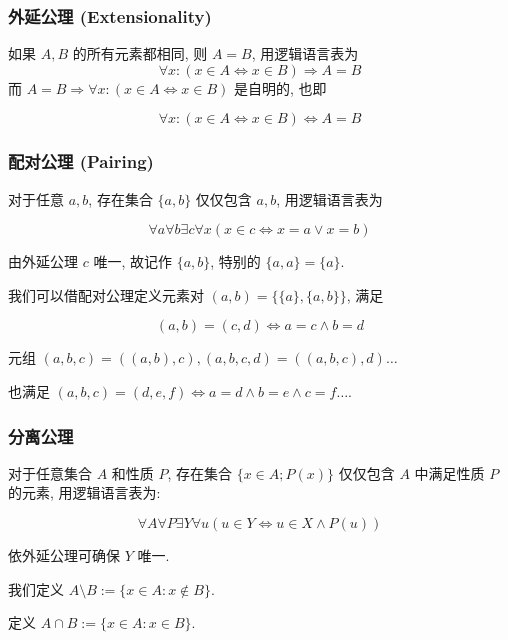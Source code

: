 \subsubsection{外延公理 (Extensionality)}

如果 \(A, B\) 的所有元素都相同, 则 \(A = B\), 用逻辑语言表为
\[
    \forall x : (x \in A \Leftrightarrow x \in B) \Rightarrow A = B
\]
而 \(A = B \Rightarrow \forall x : (x \in A \Leftrightarrow x \in B)\) 是自明的, 也即 

\[
    \forall x : (x \in A \Leftrightarrow x \in B) \Leftrightarrow A = B
\]

\subsubsection{配对公理 (Pairing)}

对于任意 \(a, b\), 存在集合 \(\{a,b\}\) 仅仅包含 \(a,b\), 用逻辑语言表为

\[
    \forall a \forall b \exists c \forall x (x \in c \Leftrightarrow x = a \vee x = b)
\]

由外延公理 \(c\) 唯一, 故记作 \(\{a,b\}\), 特别的 \(\{a,a\} = \{a\}\).

\begin{example}
    我们可以借配对公理定义元素对 \((a,b) = \{\{a\}, \{a,b\}\}\), 满足

    \[
        (a,b) = (c,d) \Leftrightarrow a = c \wedge b = d
    \]

    元组 \((a,b,c) = ((a,b),c), (a,b,c,d) = ((a,b,c),d) \dots\)

    也满足 \((a,b,c) = (d,e,f) \Leftrightarrow a = d \wedge b = e \wedge c = f \dots\).
\end{example}

\subsubsection{分离公理}

对于任意集合 \(A\) 和性质 \(P\), 存在集合 \(\{x \in A; P(x)\}\) 仅仅包含 \(A\) 中满足性质 \(P\) 的元素,
用逻辑语言表为:

\[
    \forall A \forall P \exists Y \forall u (u \in Y \Leftrightarrow u \in X \wedge P(u))
\]

依外延公理可确保 \(Y\) 唯一.

\begin{definition}
    我们定义 \(A \setminus B := \{x \in A : x \notin B\}\).

    定义 \(A \cap B := \{x \in A : x \in B\}\).
\end{definition}

